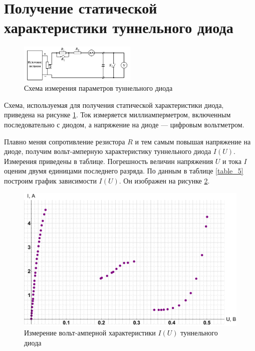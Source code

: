 \documentclass[12pt]{kiarticle}
\begin{document}
	
	
%	
%	
%	
	
	
	\section{Получение статической характеристики туннельного диода}
	
		\begin{figure}[h]
		\centering	
		\includegraphics[width=0.5\textwidth]{scheme.png}
		\caption{Схема измерения параметров туннельного диода}
		\label{pic:scheme}
	\end{figure}
	
	Схема, используемая для получения статической характеристики диода, приведена на рисунке \ref{pic:scheme}. Ток измеряется миллиамперметром, включенным последовательно с диодом, а напряжение на диоде --- цифровым вольтметром. 
	
	Плавно меняя сопротивление резистора $ R $ и тем самым повышая напряжение на диоде, получим вольт-амперную характеристику туннельного диода $I(U)$.  Измерения приведены в таблице. Погрешность величин напряжения $U$ и тока $I$ оценим двумя единицами последнего разряда. По данным в таблице \ref{table_5} построим график зависимости $I(U)$. Он изображен на рисунке \ref{graf}. 
	
	\begin{figure}[h]
		\includegraphics[scale=0.47]{graf.pdf}
		\caption{Измерение вольт-амперной характеристики $I(U)$ туннельного диода}
		\label{graf}
	\end{figure}
	
\end{document}
